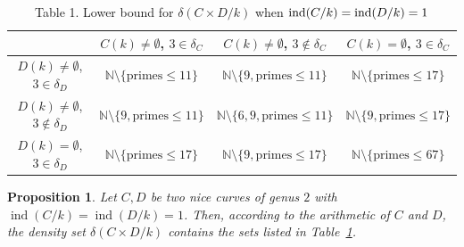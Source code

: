\documentclass[a4paper,11pt]{amsart}
\theoremstyle{plain}
\newtheorem{prop}[thm]{Proposition}
\theoremstyle{remark}
\newcommand{\nn}{\mathbb{N}}
\newcommand{\dendegs}{\delta}
\newcommand{\ind}{\operatorname{ind}}
\begin{document}
\begin{small}
    

\begingroup
\renewcommand*{\arraystretch}{1.1}
\begin{table}[h!]
\begin{tabular}{| c | c | c |c|} 
\hline
& 
$C(k)\neq\emptyset$, $3\in\delta_C $  
& 
$C(k)\neq\emptyset$, $3\not\in\delta_C $  
& 
$C(k)=\emptyset$, $3\in \delta_C$   
\\
\hline
$D(k)\neq\emptyset$, $3\in\delta_D$  
& 
$\nn\setminus \{\text{primes}\leq 11\}$ 
& 
$\nn\setminus\{9, \text{primes}\leq 11\}$ 
& 
$\nn\setminus \{\text{primes}\leq 17\}$ 
\\
\hline
$D(k)\neq\emptyset$, $3\not\in\delta_D$
& $\nn\setminus\{9,\text{primes}\leq 11\}$ 
& $\nn\setminus\{6, 9, \text{primes}\leq 11\}$ 
& $\nn\setminus\{9, \text{primes}\leq 17\}$ 
\\
\hline 
$D(k)=\emptyset$, $3\in \delta_D$
&  $\nn\setminus \{\text{primes}\leq 17\}$ 
& $\nn\setminus\{9,\text{primes}\leq 17\}$ 
& $\nn\setminus\{\text{primes}\leq 67\}$
\\
\hline
\end{tabular}
\caption{Table 1. Lower bound for $\dendegs(C\times D/k)$ when $\textup{ind}(C/k) = \textup{ind}(D/k)=1$}\label{Table1}
\end{table}
\endgroup
\end{small}



\begin{prop}\label{prop:summary1}
    Let $C, D$ be two nice curves of genus $2$ with $\ind(C/k)=\ind(D/k)=1$. 
    Then, according to the arithmetic of $C$ and $D$, the density set $\dendegs(C\times D/k)$ contains the sets listed in Table~\ref{Table1}. 
\end{prop}
\end{document}
